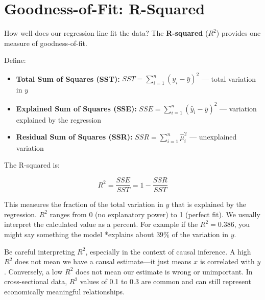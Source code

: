 \documentclass[
  letterpaper,
  DIV=11,
  numbers=noendperiod]{scrreprt}
\providecommand{\tightlist}{%
  \setlength{\itemsep}{0pt}\setlength{\parskip}{0pt}}
\begin{document}
\section{Goodness-of-Fit: R-Squared}\label{goodness-of-fit-r-squared}

How well does our regression line fit the data? The \textbf{R-squared}
(\(R^2\)) provides one measure of goodness-of-fit.

Define:

\begin{itemize}
\tightlist
\item
  \textbf{Total Sum of Squares (SST):}
  \(SST = \sum_{i=1}^{n}(y_i - \bar{y})^2\) --- total variation in \(y\)
\item
  \textbf{Explained Sum of Squares (SSE):}
  \(SSE = \sum_{i=1}^{n}(\hat{y}_i - \bar{y})^2\) --- variation
  explained by the regression
\item
  \textbf{Residual Sum of Squares (SSR):}
  \(SSR = \sum_{i=1}^{n}\hat{\mu}_i^2\) --- unexplained variation
\end{itemize}

The R-squared is:

\[
R^2 = \frac{SSE}{SST} = 1 - \frac{SSR}{SST}
\]

This measures the fraction of the total variation in \(y\) that is
explained by the regression. \(R^2\) ranges from 0 (no explanatory
power) to 1 (perfect fit). We usually interpret the calculated value as
a percent. For example if the \(R^2 = 0.386\), you might say something
the model *explains about \(39\%\) of the variation in \(y\).

\begin{tcolorbox}[enhanced jigsaw, arc=.35mm, bottomrule=.15mm, bottomtitle=1mm, breakable, colback=white, colbacktitle=quarto-callout-warning-color!10!white, colframe=quarto-callout-warning-color-frame, coltitle=black, left=2mm, leftrule=.75mm, opacityback=0, opacitybacktitle=0.6, rightrule=.15mm, title=\textcolor{quarto-callout-warning-color}{\faExclamationTriangle}\hspace{0.5em}{Interpreting R-Squared}, titlerule=0mm, toprule=.15mm, toptitle=1mm]

Be careful interpreting \(R^2\), especially in the context of causal
inference. A high \(R^2\) does not mean we have a causal estimate---it
just means \(x\) is correlated with \(y\). Conversely, a low \(R^2\)
does not mean our estimate is wrong or unimportant. In cross-sectional
data, \(R^2\) values of 0.1 to 0.3 are common and can still represent
economically meaningful relationships.

\end{tcolorbox}
\end{document}
